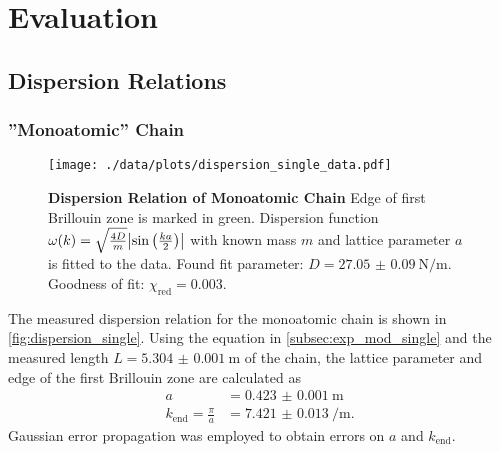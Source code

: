 \chapter{Evaluation}
\section{Dispersion Relations}

\subsection{''Monoatomic'' Chain}\label{subsec:disp_mono}
\begin{figure}
	\centering
	\texttt{[image: ./data/plots/dispersion\_single\_data.pdf]}
	\caption[Dispersion Relation of Monoatomic Chain]{\textbf{Dispersion Relation of Monoatomic Chain} Edge of first Brillouin zone is marked in green.
	Dispersion function $\omega(k) = \sqrt{\frac{4D}{m}}\abs{\sin\left(\frac{ka}{2}\right)}$ with known mass $m$ and lattice parameter $a$ is fitted to the data.
	Found fit parameter: $D=\SI{27.05(9)}{\newton\per\meter}$. Goodness of fit: $\chi_\text{red}=\num{0.003}$.}
	\label{fig:dispersion_single}
\end{figure}
The measured dispersion relation for the monoatomic chain is shown in \autoref{fig:dispersion_single}.
Using the equation in \autoref{subsec:exp_mod_single} and the measured length $L=\SI{5.304(1)}{\meter}$ of the chain, the lattice parameter and edge of the first Brillouin zone are calculated as
\begin{align*}
	a &= \SI{0.423(1)}{\meter} \\
	k_\text{end} = \frac{\pi}{a} &= \SI{7.421(13)}{\per\meter}.
\end{align*}
Gaussian error propagation was employed to obtain errors on $a$ and $k_\text{end}$.

